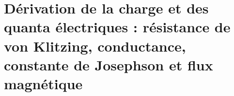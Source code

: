 \chapter{Dérivation de la charge et des quanta électriques : résistance de von Klitzing, conductance, constante de Josephson et flux magnétique}
\label{chap:p3-final:40:cuantos_electricos}

